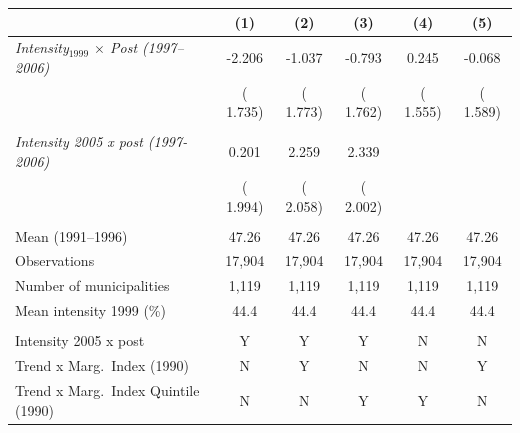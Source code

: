 \begin{tabular}{lccccc} \hline \hline
& \multicolumn{1}{c}{(1)} & \multicolumn{1}{c}{(2)} & \multicolumn{1}{c}{(3)} & \multicolumn{1}{c}{(4)} & \multicolumn{1}{c}{(5)} \\ \toprule
\textit{Intensity$_{1999}$ $\times$ Post (1997--2006)} &       -2.206 &       -1.037 &       -0.793 &        0.245 &       -0.068 \\ 
 & (       1.735) & (       1.773) & (       1.762) & (       1.555) & (       1.589) \\ 
  & & & & & \\ 
\textit{Intensity 2005 x post (1997-2006)} &        0.201 &        2.259 &        2.339 & & \\ 
 & (       1.994) & (       2.058) & (       2.002) & & \\ 
  & & & & & \\ 
Mean (1991--1996) &        47.26 &        47.26 &        47.26 &        47.26 &        47.26 \\ 
Observations &       17,904 &       17,904 &       17,904 &       17,904 &       17,904 \\ 
Number of municipalities &        1,119 &        1,119 &        1,119 &        1,119 &        1,119 \\ 
Mean intensity 1999 (\%) &   44.4 &   44.4 &   44.4 &   44.4 &   44.4 \\ 
  & & & & & \\ 
Intensity 2005 x post & Y & Y & Y & N & N \\ Trend x Marg.\ Index (1990) & N & Y & N & N & Y \\ Trend x Marg.\ Index Quintile (1990) & N & N & Y & Y & N \\ 
\bottomrule
\end{tabular}